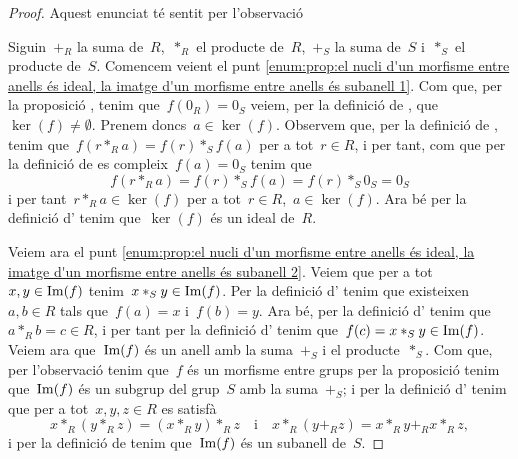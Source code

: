 \documentclass[../../main.tex]{subfiles}
\begin{document}
    \begin{proof}
        Aquest enunciat té sentit per l'observació 

        Siguin~\(+_{R}\) la suma de~\(R\),~\(\ast_{R}\) el producte de~\(R\),~\(+_{S}\) la suma de~\(S\) i~\(\ast_{S}\) el producte de~\(S\).
        Comencem veient el punt \eqref{enum:prop:el nucli d'un morfisme entre anells és ideal, la imatge d'un morfisme entre anells és subanell 1}.
        Com que, per la proposició , tenim que~\(f(0_{R})=0_{S}\) veiem, per la definició de , que~\(\ker(f)\neq\emptyset\).
        Prenem doncs~\(a\in\ker(f)\).
        Observem que, per la definició de , tenim que~\(f(r\ast_{R}a)=f(r)\ast_{S}f(a)\) per a tot~\(r\in R\), i per tant, com que per la definició de  es compleix~\(f(a)=0_{S}\) tenim que \[f(r\ast_{R}a)=f(r)\ast_{S}f(a)=f(r)\ast_{S}0_{S}=0_{S}\]
        i per tant~\(r\ast_{R}a\in\ker(f)\) per a tot~\(r\in R\),~\(a\in\ker(f)\).
        Ara bé per la definició d' tenim que~\(\ker(f)\) és un ideal de~\(R\).

        Veiem ara el punt \eqref{enum:prop:el nucli d'un morfisme entre anells és ideal, la imatge d'un morfisme entre anells és subanell 2}.
        Veiem que per a tot~\(x,y\in\operatorname{Im}(f)\) tenim~\(x\ast_{S}y\in\operatorname{Im}(f)\).
        Per la definició d' tenim que existeixen~\(a,b\in R\) tals que~\(f(a)=x\) i~\(f(b)=y\).
        Ara bé, per la definició d' tenim que~\(a\ast_{R}b=c\in R\), i per tant per la definició d' tenim que~\(f(c)=x\ast_{S}y\in\operatorname{Im}(f)\).
        Veiem ara que~\(\operatorname{Im}(f)\) és un anell amb la suma~\(+_{S}\) i el producte~\(\ast_{S}\).
        Com que, per l'observació  tenim que~\(f\) és un morfisme entre grups per la proposició  tenim que~\(\operatorname{Im}(f)\) és un subgrup del grup~\(S\) amb la suma~\(+_{S}\); i per la definició d' tenim que per a tot~\(x,y,z\in R\) es satisfà
        \[
            x\ast_{R}(y\ast_{R}z)=(x\ast_{R}y)\ast_{R}z\quad\text{i}\quad x\ast_{R}(y+_{R}z)=x\ast_{R}y+_{R}x\ast_{R}z,
        \]
        i per la definició de  tenim que~\(\operatorname{Im}(f)\) és un subanell de~\(S\).
    \end{proof}
\end{document}
